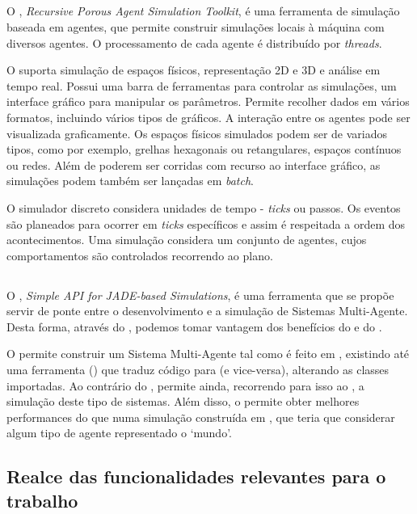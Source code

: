 \documentclass[12pt]{report}
\begin{document}
\subsection{\repast}
O \repast, \emph{Recursive Porous Agent Simulation Toolkit}, é uma ferramenta de simulação baseada em agentes, que permite construir simulações locais à máquina com diversos agentes. O processamento de cada agente é distribuído por \emph{threads}.

O \repast suporta simulação de espaços físicos, representação 2D e 3D e análise em tempo real. Possui uma barra de ferramentas para controlar as simulações, um interface gráfico para manipular os parâmetros. Permite recolher dados em vários formatos, incluindo vários tipos de gráficos. A interação entre os agentes pode ser visualizada graficamente. Os espaços físicos simulados podem ser de variados tipos, como por exemplo, grelhas hexagonais ou retangulares, espaços contínuos ou redes. Além de poderem ser corridas com recurso ao interface gráfico, as simulações podem também ser lançadas em \emph{batch}.
  
O simulador discreto considera unidades de tempo - \emph{ticks} ou passos. Os eventos são planeados para ocorrer em \emph{ticks} específicos e assim é respeitada a ordem dos acontecimentos. Uma simulação considera um conjunto de agentes, cujos comportamentos são controlados recorrendo ao plano.

\subsection{\sajas}
O \sajas, \emph{Simple API for JADE-based Simulations}, é uma ferramenta que se propõe servir de ponte entre o desenvolvimento e a simulação de Sistemas Multi-Agente. Desta forma, através do \sajas, podemos tomar vantagem dos benefícios do \jade e do \repast.

O \sajas permite construir um Sistema Multi-Agente tal como é feito em \jade, existindo até uma ferramenta (\massim) que traduz código \jade para \sajas (e vice-versa), alterando as classes importadas. Ao contrário do \jade, permite ainda, recorrendo para isso ao \repast, a simulação deste tipo de sistemas. Além disso, o \sajas permite obter melhores performances do que numa simulação construída em \jade, que teria que considerar algum tipo de agente representado o `mundo'.

\subsection{Realce das funcionalidades relevantes para o trabalho}
\end{document}
